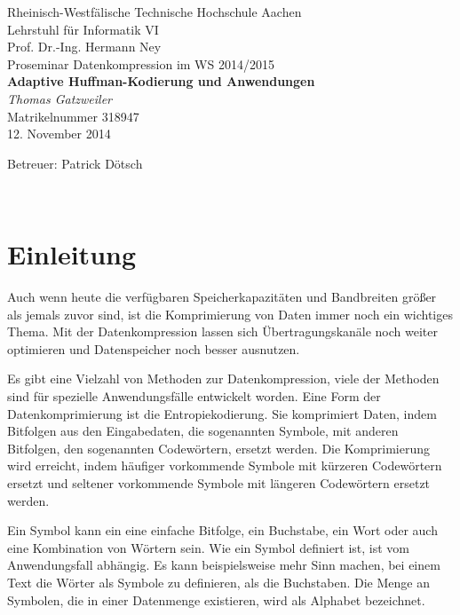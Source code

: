 \documentclass[twoside,11pt,a4paper]{article}
\theoremstyle{break}
\begin{document}

\pagestyle{empty}
\begin{center}
    Rheinisch-Westfälische Technische Hochschule Aachen \\
    Lehrstuhl für Informatik VI \\
    Prof. Dr.-Ing. Hermann Ney\\[6ex]
    Proseminar Datenkompression im WS 2014/2015\\[12ex]

    \LARGE
    \textbf{Adaptive Huffman-Kodierung und Anwendungen} \\[6ex]
    \textit{Thomas Gatzweiler} \\[6ex]
    \Large
    Matrikelnummer 318947 \\[6ex]
    12. November 2014

    \vfill
    \Large Betreuer: Patrick Dötsch
\end{center}

\newpage
\
\newpage

\pagestyle{headings}
\tableofcontents
\listoftables
\listoffigures
\newpage
\pagestyle{empty}
\newpage
\pagestyle{headings}


\newcommand{\sectionbreak}{\clearpage}

\nocite{*}

\section{Einleitung}
Auch wenn heute die verfügbaren Speicherkapazitäten und Bandbreiten
größer als jemals zuvor sind, ist die Komprimierung von Daten immer
noch ein wichtiges Thema. Mit der Datenkompression lassen sich
Übertragungskanäle noch weiter optimieren und Datenspeicher noch
besser ausnutzen.

Es gibt eine Vielzahl von Methoden zur Datenkompression, viele der
Methoden sind für spezielle Anwendungsfälle entwickelt worden. Eine
Form der Datenkomprimierung ist die Entropiekodierung. Sie komprimiert
Daten, indem Bitfolgen aus den Eingabedaten, die sogenannten Symbole,
mit anderen Bitfolgen, den sogenannten Codewörtern, ersetzt
werden. Die Komprimierung wird erreicht, indem häufiger vorkommende
Symbole mit kürzeren Codewörtern ersetzt und seltener vorkommende
Symbole mit längeren Codewörtern ersetzt werden.

Ein Symbol kann ein eine einfache Bitfolge, ein Buchstabe, ein Wort
oder auch eine Kombination von Wörtern sein. Wie ein Symbol definiert
ist, ist vom Anwendungsfall abhängig. Es kann beispielsweise mehr Sinn
machen, bei einem Text die Wörter als Symbole zu definieren, als die
Buchstaben. Die Menge an Symbolen, die in einer Datenmenge existieren,
wird als Alphabet bezeichnet.
\end{document}
